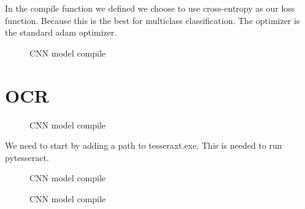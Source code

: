 In the compile function we defined we choose to use cross-entropy as our loss function.
Because this is the best for multiclass classification.
The optimizer is the standard adam optimizer.

\begin{figure}[h]
    \caption{CNN model compile}
    \label{fig:figure5}

\end{figure}


\section{OCR}\label{sec:OCR_implementation}


\begin{figure}[h]
    \caption{CNN model compile}
    \label{fig:figure7}
\end{figure}

We need to start by adding a path to tesseraxt.exe.
This is needed to run pytesseract.




\begin{figure}[h]
    \caption{CNN model compile}
    \label{fig:figure8}

\end{figure}

\begin{figure}[h]
    \caption{CNN model compile}
    \label{fig:figure9}

\end{figure}
